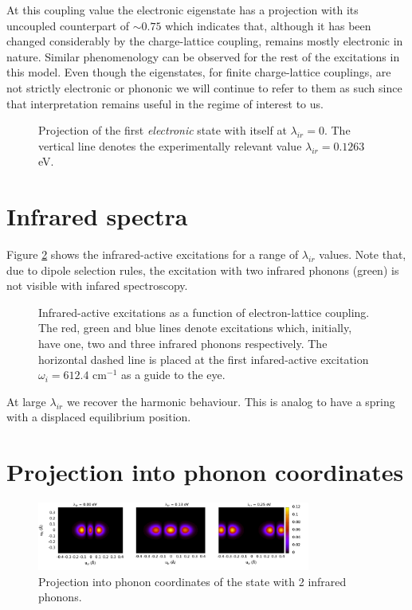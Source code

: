 At this coupling value the electronic eigenstate has a projection with its uncoupled counterpart of $\sim 0.75$ which indicates that, although it has been changed considerably by the charge-lattice coupling, remains mostly electronic in nature.
Similar phenomenology can be observed for the rest of the excitations in this model.
Even though the eigenstates, for finite charge-lattice couplings, are not strictly electronic or phononic we will continue to refer to them as such since that interpretation remains useful in the regime of interest to us.
%
\begin{figure}
  \centering
  
  \caption[Projection of the first \textit{electronic} state with itself at $\lambda_{ir}=0$.]
  {Projection of the first \textit{electronic} state with itself at $\lambda_{ir}=0$.
    The vertical line denotes the experimentally relevant value $\lambda_{ir}=0.1263$ eV.}
  \label{fig:electr-proj}
\end{figure}

\section{Infrared spectra}

Figure \ref{fig:irSpectra} shows the infrared-active excitations for a range of $\lambda_{ir}$ values.
Note that, due to dipole selection rules, the excitation with two infrared phonons (green) is not visible with infared spectroscopy.

\begin{figure}
  \centering
  
  \caption[Infrared-active excitations as a function of electron-lattice coupling.]
  {Infrared-active excitations as a function of electron-lattice coupling.
  The red, green and blue lines denote excitations which, initially, have one, two and three infrared phonons respectively.
  The horizontal dashed line is placed at the first infared-active excitation $\omega_i=612.4$ cm$^{-1}$ as a guide to the eye.}
  \label{fig:irSpectra}
\end{figure}


At large $\lambda_{ir}$ we recover the harmonic behaviour. This is analog to have a spring with a displaced equilibrium position.

\section{Projection into phonon coordinates}

\begin{figure}[ht!]
  \centering
  \includegraphics[width=0.8\textwidth]{images/ph-second_infrared.png}
  \caption{Projection into phonon coordinates of the state with 2 infrared phonons.}
  \label{fig:ph-second_infrared}
\end{figure}

